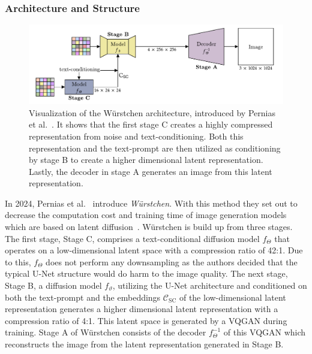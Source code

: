\subsubsection{Architecture and Structure}
\begin{figure}[t]
    \includegraphics[width=\textwidth]{assets/wuerstchen_arch.pdf}
    \caption{Visualization of the W\"urstchen architecture, introduced by
        Pernias et al.~\cite{pernias2024wrstchen}. It shows that the first stage C
        creates a highly compressed representation from noise and text-conditioning.
        Both this representation and the text-prompt are then utilized as conditioning by stage B
        to create a higher dimensional latent representation. Lastly, the decoder
        in stage A generates an image from this latent representation.}
    \label{fig:wuerstchen:arch}
\end{figure}
In 2024, Pernias et al.~\cite{pernias2024wrstchen} introduce \emph{W\"urstchen}.
With this method they set out to decrease the computation cost and training
time of image generation models which are based on latent diffusion~\cite{rombach2022stablediffusion}.
W\"urstchen is build up from three stages. The first stage, Stage C, comprises
a text-conditional diffusion model $f_\Theta$ that operates on a
low-dimensional latent space with a compression ratio of 42:1. Due to this,
$f_\Theta$ does not perform any downsampling as the authors decided that the
typical U-Net structure would do harm to the image quality. The next stage,
Stage B, a diffusion model $f_\vartheta$, utilizing the U-Net architecture and
conditioned on both the text-prompt and the embeddings $\mathcal{C}_{\text{SC}}$
of the low-dimensional latent representation generates a higher dimensional
latent representation with a compression ratio of 4:1. This latent space is
generated by a VQGAN during training. Stage A of W\"urstchen consists of the decoder $f_\Theta^{-1}$
of this VQGAN which reconstructs the image from the latent representation
generated in Stage B.

